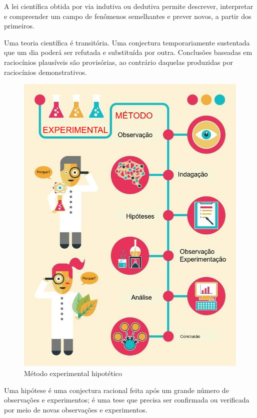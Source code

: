 \documentclass[
]{book}
\begin{document}
\hfill\break

A lei científica obtida por via indutiva ou dedutiva permite descrever, interpretar e compreender um campo de fenômenos semelhantes e prever novos, a partir dos primeiros.

\hfill\break

Uma teoria científica é transitória. Uma conjectura temporariamente sustentada que um dia poderá ser refutada e substituída por outra. Conclusões baseadas em raciocínios plausíveis são provisórias, ao contrário daquelas produzidas por raciocínios demonstrativos.

\hfill\break

\begin{figure}

{\centering \includegraphics[width=0.8\linewidth]{images11/metodo_experimental} 

}

\caption{Método experimental hipotético}\label{fig:unnamed-chunk-116}
\end{figure}

\hfill\break

Uma hipótese é uma conjectura racional feita após um grande número de observações e experimentos; é uma tese que precisa ser confirmada ou verificada por meio de novas observações e experimentos.
\end{document}
